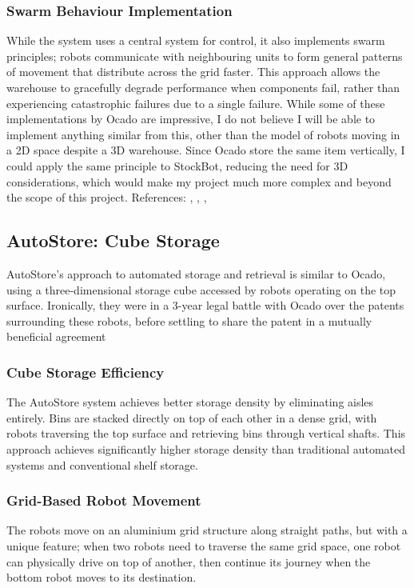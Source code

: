 \subsubsection{Swarm Behaviour Implementation}
While the system uses a central system for control, it also implements swarm principles; robots communicate with neighbouring units to form general patterns of movement that distribute across the grid faster. This approach allows the warehouse to gracefully degrade performance when components fail, rather than experiencing catastrophic failures due to a single failure. \newline
\textbf{ }
\newline While some of these implementations by Ocado are impressive, I do not believe I will be able to implement anything similar from this, other than the model of robots moving in a 2D space despite a 3D warehouse. Since Ocado store the same item vertically, I could apply the same principle to StockBot, reducing the need for 3D considerations, which would make my project much more complex and beyond the scope of this project. \newline References: \cite{a2024_joseph}, \cite{group_2024_the}, \cite{group_2023_the}, \cite{group_2020_explained}

\subsection{AutoStore: Cube Storage}

AutoStore's approach to automated storage and retrieval is similar to Ocado, using a three-dimensional storage cube accessed by robots operating on the top surface. Ironically, they were in a 3-year legal battle with Ocado over the patents surrounding these robots, before settling to share the patent in a mutually beneficial agreement \cite{speed_2023_ocado}

\subsubsection{Cube Storage Efficiency}
The AutoStore system achieves better storage density by eliminating aisles entirely. Bins are stacked directly on top of each other in a dense grid, with robots traversing the top surface and retrieving bins through vertical shafts. This approach achieves significantly higher storage density than traditional automated systems and conventional shelf storage.

\subsubsection{Grid-Based Robot Movement}
The robots move on an aluminium grid structure along straight paths, but with a unique feature; when two robots need to traverse the same grid space, one robot can physically drive on top of another, then continue its journey when the bottom robot moves to its destination.

